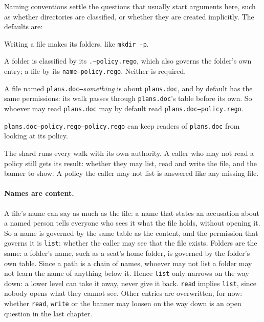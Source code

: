 \documentclass[11pt,oneside]{book}
\providecommand{\tightlist}{\setlength{\itemsep}{0pt}\setlength{\parskip}{0pt}}
\begin{document}
Naming conventions settle the questions that usually start arguments here,
such as whether directories are classified, or whether they are created
implicitly. The defaults are:
\begin{description}\tightlist
\item[Folders are implicit.] Writing a file makes its folders, like
  \texttt{mkdir -p}.
\item[Classify a folder or a file.] A folder is classified by its
  \texttt{.--policy.rego}, which also governs the folder's own entry; a file by
  its \texttt{name--policy.rego}. Neither is required.
\item[Metadata about a file is named after it.] A file named
  \texttt{plans.doc--}\textit{something} is about \texttt{plans.doc}, and by
  default has the same permissions: its walk passes through
  \texttt{plans.doc}'s table before its own. So whoever may read
  \texttt{plans.doc} may by default read \texttt{plans.doc--policy.rego}.
\item[Restricting metadata is more of the same.]
  \texttt{plans.doc--policy.rego--policy.rego} can keep readers of
  \texttt{plans.doc} from looking at its policy.
\end{description}
The shard runs every walk with its own authority. A caller who may not read a
policy still gets its result: whether they may list, read and write the file, and the
banner to show. A policy the caller may not list is answered like any missing
file.

\paragraph{Names are content.} A file's name can say as much as the file: a name
that states an accusation about a named person tells everyone who sees it what the
file holds, without opening it. So a name is governed by the same table as the
content, and the permission that governs it is \texttt{list}: whether the
caller may see that the file exists. Folders are the same: a folder's name, such
as a seat's home folder, is governed by the folder's own table. Since a path is a
chain of names, whoever may not list a folder may not learn the name of anything
below it. Hence \texttt{list} only narrows on the way down: a lower level can take
it away, never give it back. \texttt{read} implies \texttt{list}, since nobody
opens what they cannot see. Other entries are overwritten, for now: whether
\texttt{read}, \texttt{write} or the banner may loosen on the way down is an
open question in the last chapter.
\end{document}
